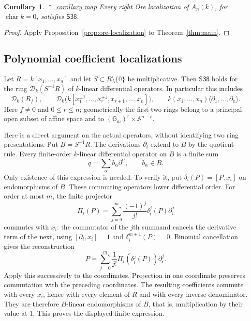 \documentclass[11pt]{article}
\theoremstyle{plain}
\newtheorem{corollary}[theorem]{Corollary}
\theoremstyle{definition}
\theoremstyle{remark}
\theoremstyle{plain}
\newcommand{\phasestatus}[1]{%
  \par\smallskip\noindent{\footnotesize\sffamily\textbf{Lean status:} #1}%
  \par\smallskip}
\begin{document}
\begin{corollary}\label{cor:localized-weyl}\label{sec:localized-weyl}
{\normalfont\footnotesize\hyperref[fig:corollaries]{$\uparrow$ corollary map}}
Every right Ore localization of $A_n(k)$, for $\operatorname{char}k=0$,
satisfies $\mathsf{S38}$.
\end{corollary}
\begin{proof}
Apply Proposition~\ref{prop:ore-localization} to Theorem~\ref{thm:main}.
\end{proof}

\subsection{Polynomial coefficient localizations}\label{sec:coefficient-open-examples}
\par{}
\phasestatus{Phase II complete.}
Let $R=k[x_1,\ldots,x_n]$ and let $S\subset R\setminus\{0\}$ be multiplicative.
Then $\mathsf{S38}$ holds for the ring $\mathcal D_k(S^{-1}R)$ of
$k$-linear differential operators. In particular this includes
\[
 \mathcal D_k(R_f),\qquad
 \mathcal D_k\bigl(k[x_1^{\pm1},\ldots,x_r^{\pm1},x_{r+1},\ldots,x_n]\bigr),
 \qquad
 k(x_1,\ldots,x_n)\langle\partial_1,\ldots,\partial_n\rangle .
\]
Here $f\ne0$ and $0\le r\le n$; geometrically the first two rings belong to
a principal open subset of affine space and to
$(\mathbb G_m)^r\times\mathbb A^{n-r}$.

Here is a direct argument on the actual operators, without identifying two
ring presentations. Put $B=S^{-1}R$. The derivations $\partial_i$ extend to
$B$ by the quotient rule. Every finite-order $k$-linear differential operator
on $B$ is a finite sum
\[
 q=\sum_\alpha b_\alpha\partial^\alpha,\qquad b_\alpha\in B.
\]
Only existence of this expression is needed. To verify it, put
$\delta_i(P)=[P,x_i]$ on endomorphisms of $B$. These commuting operators
lower differential order. For order at most $m$, the finite projector
\[
 \Pi_i(P)=\sum_{j=0}^{m}\frac{(-1)^j}{j!}
             \delta_i^j(P)\partial_i^j
\]
commutes with $x_i$: the commutator of the $j$th summand cancels the
derivative term of the next, using $[\partial_i,x_i]=1$ and
$\delta_i^{m+1}(P)=0$. Binomial cancellation gives the reconstruction
\[
 P=\sum_{j=0}^{m}\frac{1}{j!}\Pi_i(\delta_i^j(P))\partial_i^j.
\]
Apply this successively to the coordinates. Projection in one coordinate
preserves commutation with the preceding coordinates. The resulting
coefficients commute with every $x_i$, hence with every element of $R$
and with every inverse denominator. They are therefore $B$-linear
endomorphisms of $B$, that is, multiplication by their value at $1$.
This proves the displayed finite expression.
\end{document}
